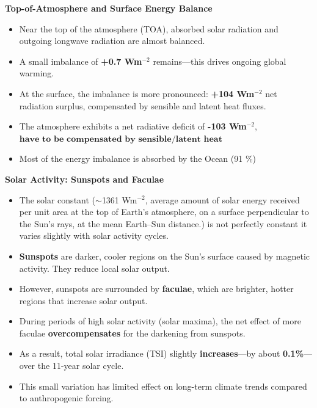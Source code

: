 \documentclass[fontsize=8pt, a4paper, landscape, fleqn]{scrartcl}
\renewcommand{\subsection}[1]{%
    \noindent\colorbox{subsectioncolor}{%
        \parbox{\dimexpr\columnwidth-2\fboxsep}{\color{white}\textbf{#1}}}%
    \vspace{0.5mm}%
}
\begin{document}
\begin{multicols*}{3}[\raggedcolumns]
\subsection{Top-of-Atmosphere and Surface Energy Balance}
\begin{itemize}
    \item Near the top of the atmosphere (TOA), absorbed solar radiation and outgoing longwave radiation are almost balanced.
    \item A small imbalance of \textbf{+0.7 Wm$^{-2}$} remains—this drives ongoing global warming.
    \item At the surface, the imbalance is more pronounced: \textbf{+104 Wm$^{-2}$} net radiation surplus, compensated by sensible and latent heat fluxes.
    \item The atmosphere exhibits a net radiative deficit of \textbf{-103 Wm$^{-2}$}, $\textbf{have to be compensated by sensible/latent heat}$
    \item Most of the energy imbalance is absorbed by the Ocean (91 $\%$)
\end{itemize}

\subsection{Solar Activity: Sunspots and Faculae}
\begin{itemize}
    \item The solar constant ($\sim$1361 Wm$^{-2}$, average amount of solar energy received per unit area at the top of Earth’s atmosphere, on a surface perpendicular to the Sun’s rays, at the mean Earth–Sun distance.) is not perfectly constant it varies slightly with solar activity cycles.
    \item \textbf{Sunspots} are darker, cooler regions on the Sun’s surface caused by magnetic activity. They reduce local solar output.
    \item However, sunspots are surrounded by \textbf{faculae}, which are brighter, hotter regions that increase solar output.
    \item During periods of high solar activity (solar maxima), the net effect of more faculae \textbf{overcompensates} for the darkening from sunspots.
    \item As a result, total solar irradiance (TSI) slightly \textbf{increases}—by about \textbf{0.1\%}—over the 11-year solar cycle.
    \item This small variation has limited effect on long-term climate trends compared to anthropogenic forcing.
\end{itemize}

\end{multicols*}
\end{document}
